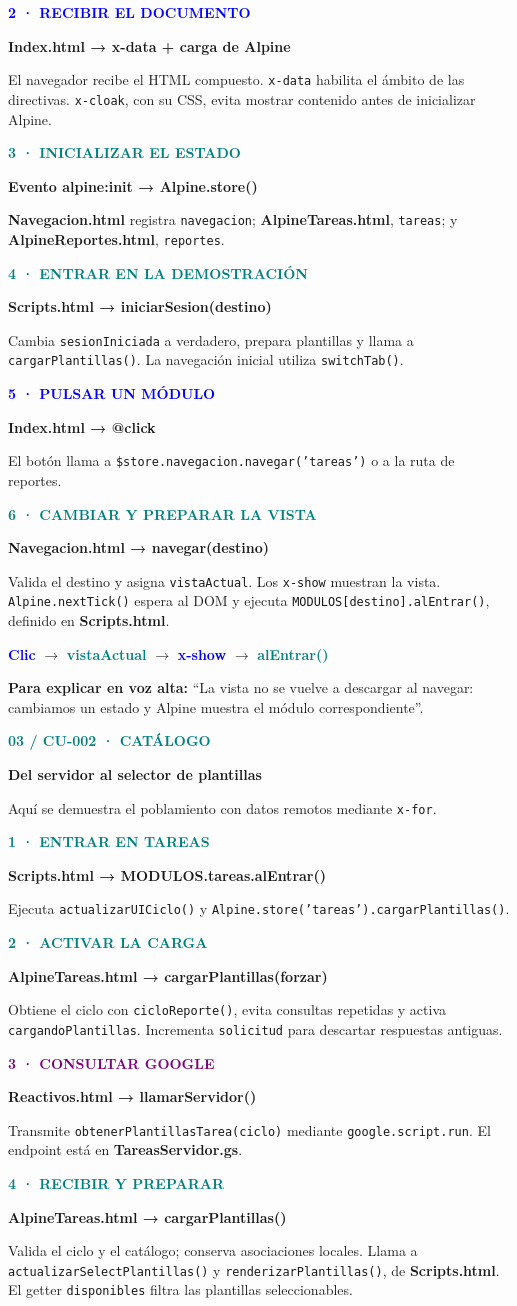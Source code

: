 \documentclass[11pt,a4paper]{article}
\newcommand{\titulo}[3]{\textcolor{teal}{\small\textbf{#1}}\par{\LARGE\bfseries #2}\par\vspace{2mm}#3\par\vspace{3mm}}
\newcommand{\paso}[4]{\begin{tcolorbox}[colback=#1!5!white,colframe=#1!40!white,boxrule=0.5pt,arc=2mm,left=3mm,right=3mm,top=2mm,bottom=2mm]\textcolor{#1}{\textbf{#2}}\par\textbf{#3}\par #4\end{tcolorbox}}
\newcommand{\nota}[2]{\begin{tcolorbox}[colback=amber!8!white,colframe=amber!40!white,boxrule=0.5pt,arc=2mm]\textcolor{amber}{\textbf{#1}} #2\end{tcolorbox}}
\newcommand{\archivo}[1]{\textbf{#1}}
\newcommand{\met}[1]{\texttt{#1}}
\begin{document}
\paso{blue}{2 · RECIBIR EL DOCUMENTO}{Index.html → x-data + carga de Alpine}{El navegador recibe el HTML compuesto. \met{x-data} habilita el ámbito de las directivas. \met{x-cloak}, con su CSS, evita mostrar contenido antes de inicializar Alpine.}
\paso{teal}{3 · INICIALIZAR EL ESTADO}{Evento alpine:init → Alpine.store()}{\archivo{Navegacion.html} registra \met{navegacion}; \archivo{AlpineTareas.html}, \met{tareas}; y \archivo{AlpineReportes.html}, \met{reportes}.}
\paso{teal}{4 · ENTRAR EN LA DEMOSTRACIÓN}{Scripts.html → iniciarSesion(destino)}{Cambia \met{sesionIniciada} a verdadero, prepara plantillas y llama a \met{cargarPlantillas()}. La navegación inicial utiliza \met{switchTab()}.}
\paso{blue}{5 · PULSAR UN MÓDULO}{Index.html → @click}{El botón llama a \met{\$store.navegacion.navegar('tareas')} o a la ruta de reportes.}
\paso{teal}{6 · CAMBIAR Y PREPARAR LA VISTA}{Navegacion.html → navegar(destino)}{Valida el destino y asigna \met{vistaActual}. Los \met{x-show} muestran la vista. \met{Alpine.nextTick()} espera al DOM y ejecuta \met{MODULOS[destino].alEntrar()}, definido en \archivo{Scripts.html}.}
\begin{center}\textcolor{blue}{\textbf{Clic}} $\rightarrow$ \textcolor{teal}{\textbf{vistaActual}} $\rightarrow$ \textcolor{blue}{\textbf{x-show}} $\rightarrow$ \textcolor{teal}{\textbf{alEntrar()}}\end{center}
\nota{Para explicar en voz alta:}{``La vista no se vuelve a descargar al navegar: cambiamos un estado y Alpine muestra el módulo correspondiente''.}
\newpage
\titulo{03 / CU-002 · CATÁLOGO}{Del servidor al selector de plantillas}{Aquí se demuestra el poblamiento con datos remotos mediante \met{x-for}.}
\paso{teal}{1 · ENTRAR EN TAREAS}{Scripts.html → MODULOS.tareas.alEntrar()}{Ejecuta \met{actualizarUICiclo()} y \met{Alpine.store('tareas').cargarPlantillas()}.}
\paso{teal}{2 · ACTIVAR LA CARGA}{AlpineTareas.html → cargarPlantillas(forzar)}{Obtiene el ciclo con \met{cicloReporte()}, evita consultas repetidas y activa \met{cargandoPlantillas}. Incrementa \met{solicitud} para descartar respuestas antiguas.}
\paso{purple}{3 · CONSULTAR GOOGLE}{Reactivos.html → llamarServidor()}{Transmite \met{obtenerPlantillasTarea(ciclo)} mediante \met{google.script.run}. El endpoint está en \archivo{TareasServidor.gs}.}
\paso{teal}{4 · RECIBIR Y PREPARAR}{AlpineTareas.html → cargarPlantillas()}{Valida el ciclo y el catálogo; conserva asociaciones locales. Llama a \met{actualizarSelectPlantillas()} y \met{renderizarPlantillas()}, de \archivo{Scripts.html}. El getter \met{disponibles} filtra las plantillas seleccionables.}
\end{document}
